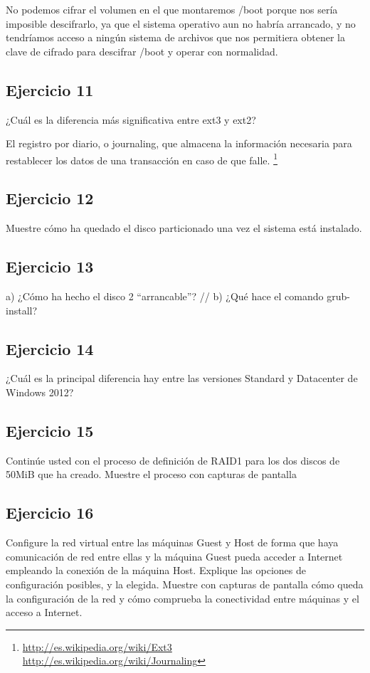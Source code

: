 \documentclass[a4paper, 11pt]{article} %
\begin{document}
No podemos cifrar el volumen en el que montaremos /boot porque nos sería imposible descifrarlo, ya que el sistema operativo aun no habría arrancado, y no tendríamos acceso a ningún sistema de archivos que nos permitiera obtener la clave de cifrado para descifrar /boot y operar con normalidad. 

\subsection*{Ejercicio 11}
¿Cuál es la diferencia más significativa entre ext3 y ext2?

El registro por diario, o journaling, que almacena la información necesaria para restablecer los datos de una transacción en caso de que falle. \footnote{\url{http://es.wikipedia.org/wiki/Ext3} \\ \url{http://es.wikipedia.org/wiki/Journaling}}


\subsection*{Ejercicio 12}
Muestre cómo ha quedado el disco particionado una vez el sistema está
instalado.


\subsection*{Ejercicio 13}
a) ¿Cómo ha hecho el disco 2 “arrancable”? //
b) ¿Qué hace el comando grub-install?


\subsection*{Ejercicio 14}
¿Cuál es la principal diferencia hay entre las versiones Standard y
Datacenter de Windows 2012?


\subsection*{Ejercicio 15}
Continúe usted con el proceso de definición de RAID1 para los dos discos
de 50MiB que ha creado. Muestre el proceso con capturas de pantalla


\subsection*{Ejercicio 16}
Configure la red virtual entre las máquinas Guest y Host de forma que
haya comunicación de red entre ellas y la máquina Guest pueda acceder a Internet
empleando la conexión de la máquina Host. Explique las opciones de configuración
posibles, y la elegida. Muestre con capturas de pantalla cómo queda la configuración
de la red y cómo comprueba la conectividad entre máquinas y el acceso a Internet.
\end{document}
